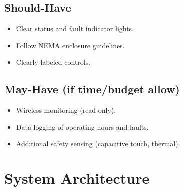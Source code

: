 \documentclass[hidelinks,12pt]{article}
\begin{document}
\subsection{Should-Have}
\begin{itemize}
    \item Clear status and fault indicator lights.
    \item Follow NEMA enclosure guidelines.
    \item Clearly labeled controls.
\end{itemize}

\subsection{May-Have (if time/budget allow)}
\begin{itemize}
    \item Wireless monitoring (read-only).
    \item Data logging of operating hours and faults.
    \item Additional safety sensing (capacitive touch, thermal).
\end{itemize}

\section{System Architecture}
\end{document}

